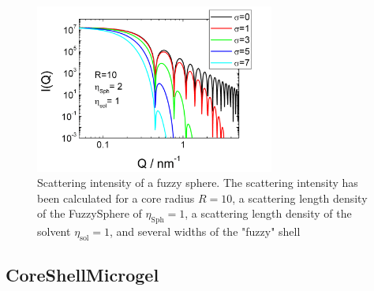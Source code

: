\begin{figure}[htb]
\begin{center}
\includegraphics[width=0.7\textwidth,height=0.5\textwidth]{../images/form_factor/FuzzySphere/FuzzySphereIQ.png}
\end{center}
\caption{Scattering intensity of a fuzzy sphere. The scattering
intensity has been calculated for a core radius $R=10$, a
scattering length density of the FuzzySphere of
$\eta_\text{Sph}=1$, a scattering length density of the solvent
$\eta_\text{sol}=1$, and several widths of the "fuzzy" shell}
\label{fig:I_FuzzySphere}
\end{figure}


\clearpage
\subsection{CoreShellMicrogel}
\label{sect:CoreShellMicrogel}

